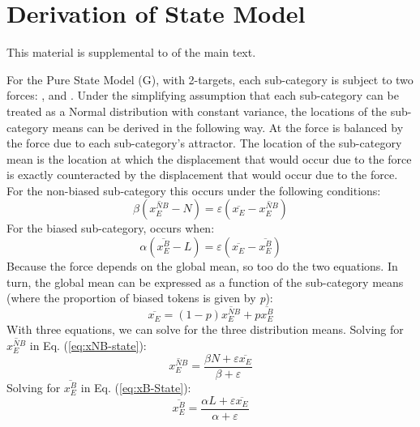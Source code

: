 \chapter{\label{chap:Appendix C}Derivation of State Model}

This material is supplemental to 
of the main text.

For the Pure State Model (G), with 2-targets, each sub-category is
subject to two forces: , and . Under the simplifying
assumption that each sub-category can be treated as a Normal distribution
with constant variance, the  locations of the sub-category
means can be derived in the following way. At  the 
force is balanced by the  force due to each sub-category's
attractor. The location of the sub-category mean is the location at
which the displacement that would occur due to the  force
is exactly counteracted by the displacement that would occur due
to the  force. For the non-biased sub-category this 
occurs under the following conditions:
\begin{equation}
\beta\left(\overline{x_{E}^{NB}}-N\right)=\varepsilon\left(\overline{x_{E}}-\overline{x_{E}^{NB}}\right)\label{eq:xNB-state}
\end{equation}
For the biased sub-category,  occurs when:
\begin{equation}
\alpha\left(\overline{x_{E}^{B}}-L\right)=\varepsilon\left(\overline{x_{E}}-\overline{x_{E}^{B}}\right)\label{eq:xB-State}
\end{equation}
Because the  force depends on the global mean, so too
do the two  equations. In turn, the global mean can be
expressed as a function of the sub-category means (where the proportion
of biased tokens is given by \emph{p}): 
\begin{equation}
\overline{x_{E}}=(1-p)\overline{x_{E}^{NB}}+p\overline{x_{E}^{B}}\label{eq:weighted-means}
\end{equation}
With three equations, we can solve for the three distribution means.
Solving for $\overline{x_{E}^{NB}}$ in Eq. (\ref{eq:xNB-state}):
\begin{equation}
\overline{x_{E}^{NB}}=\frac{\beta N+\varepsilon\overline{x_{E}}}{\beta+\varepsilon}
\end{equation}
Solving for $\overline{x_{E}^{B}}$ in Eq. (\ref{eq:xB-State}):
\begin{equation}
\overline{x_{E}^{B}}=\frac{\alpha L+\varepsilon\overline{x_{E}}}{\alpha+\varepsilon}
\end{equation}
